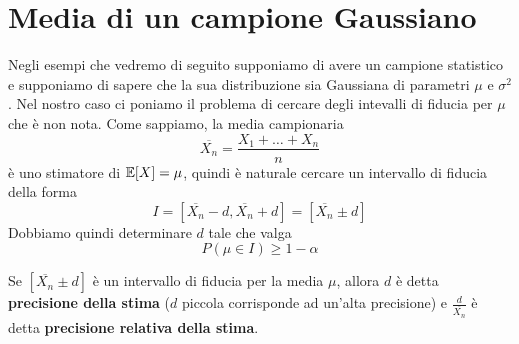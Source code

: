 \section{Media di un campione Gaussiano}
Negli esempi che vedremo di seguito supponiamo di avere un campione statistico e supponiamo di
sapere che la sua distribuzione sia Gaussiana di parametri $\mu$ e $\sigma^2$. Nel nostro caso ci
poniamo il problema di cercare degli intevalli di fiducia per $\mu$ che è non nota. Come sappiamo,
la media campionaria
\[ \overline{X_n} = \frac{X_1 + \dots + X_n}{n} \]
è uno stimatore di $\mathbb{E}[X] = \mu$, quindi è naturale cercare un intervallo di fiducia della forma
\[ I = [\overline{X_n} - d, \overline{X_n} + d] = [\overline{X_n} \pm d] \]
Dobbiamo quindi determinare $d$ tale che valga
\[ P(\mu \in I) \geq 1 - \alpha \]

\begin{definition}
	Se $[\overline{X_n} \pm d]$ è un intervallo di fiducia per la media $\mu$, allora $d$ è detta
	\textbf{precisione della stima} ($d$ piccola corrisponde ad un'alta precisione) e
	$\frac{d}{\overline{X_n}}$ è detta \textbf{precisione relativa della stima}.
\end{definition}

